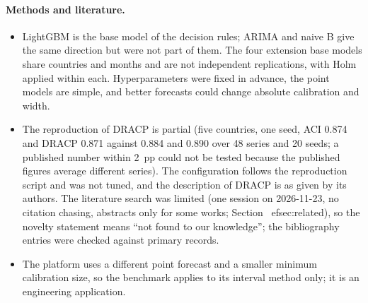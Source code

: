 \paragraph{Methods and literature.}
\begin{itemize}
\item[(4, 14)] LightGBM is the base model of the decision rules; ARIMA and naive B give the same direction but were not part of them. The four extension base models share countries and months and are not independent replications, with Holm applied within each. Hyperparameters were fixed in advance, the point models are simple, and better forecasts could change absolute calibration and width.
\item[(8, 6)] The reproduction of DRACP is partial (five countries, one seed, ACI 0.874 and DRACP 0.871 against 0.884 and 0.890 over 48 series and 20 seeds; a published number within 2~pp could not be tested because the published figures average different series). The configuration follows the reproduction script and was not tuned, and the description of DRACP is as given by its authors. The literature search was limited (one session on 2026-11-23, no citation chasing, abstracts only for some works; Section~
ef{sec:related}), so the novelty statement means ``not found to our knowledge''; the bibliography entries were checked against primary records.
\item[(13)] The platform uses a different point forecast and a smaller minimum calibration size, so the benchmark applies to its interval method only; it is an engineering application.
\end{itemize}

